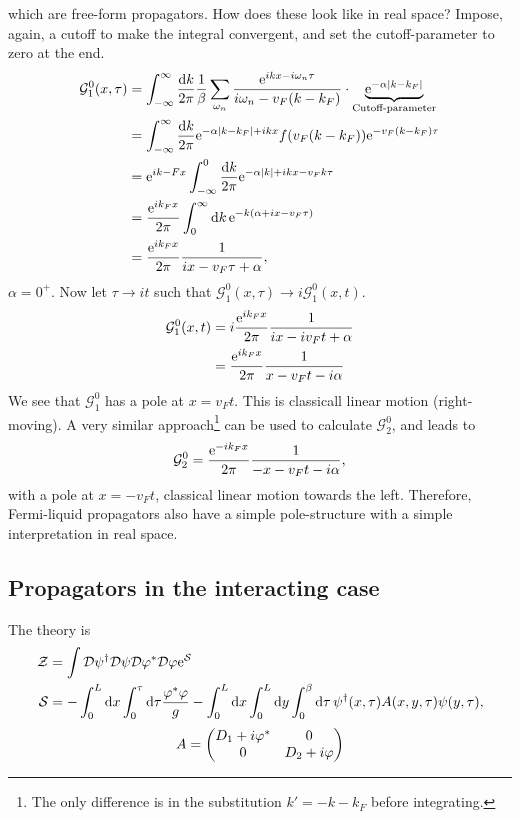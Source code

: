 which are free-form propagators. How does these look like in real space?
Impose, again, a cutoff to make the integral convergent, and set the cutoff-parameter to zero at the end.
\begin{align*}
\mathcal{G}_1^0(x, \tau) &= \int_{-\infty}^\infty\frac{\dd k}{2\pi}\frac{1}{\beta}\sum_{\omega_n}\frac{\mathrm{e}^{ikx - i\omega_n\tau}}{i\omega_n-v_F(k-k_F)}\cdot\underbrace{\mathrm{e}^{-\alpha|k-k_F|}}_{\text{Cutoff-parameter}} \\
&= \int_{-\infty}^\infty\frac{\dd k}{2\pi}\mathrm{e}^{-\alpha|k-k_F| + ikx}f(v_F(k-k_F))\mathrm{e}^{-v_F(k-k_F)\tau}\\
&=\mathrm{e}^{ik-Fx}\int_{-\infty}^0\frac{\dd k}{2\pi}\mathrm{e}^{-\alpha|k| + ikx-v_Fk\tau} \\
&=\frac{\mathrm{e}^{ik_Fx}}{2\pi}\int_0^\infty\dd k\,\mathrm{e}^{-k(\alpha + ix-v_F\tau)} \\
&= \frac{\mathrm{e}^{ik_Fx}}{2\pi}\frac{1}{ix - v_F\tau + \alpha},
\end{align*}
$\alpha = 0^+$. Now let $\tau\rightarrow it$ such that $\mathcal{G}_1^0(x,\tau)\rightarrow i\mathcal{G}_1^0(x, t)$.
\begin{align}
\begin{split}
	\mathcal{G}_1^0(x, t) &=  i\frac{\mathrm{e}^{ik_Fx}}{2\pi}\frac{1}{ix-iv_Ft+\alpha} \\
	&=\frac{\mathrm{e}^{ik_Fx}}{2\pi}\frac{1}{x-v_Ft-i\alpha}
\end{split}
\end{align}
We see that $\mathcal{G}_1^0$ has a pole at $x = v_Ft$. This is classicall linear motion (right-moving). A very similar approach\footnote{The only difference is in the substitution $k' = -k-k_F$ before integrating.} can be used to calculate $\mathcal{G}_2^0$, and leads to 
\begin{equation}
	\mathcal{G}_2^0=\frac{\mathrm{e}^{-ik_Fx}}{2\pi}\frac{1}{-x-v_Ft-i\alpha}, 
\end{equation}
with a pole at $x = -v_Ft$, classical linear motion towards the left.
Therefore, Fermi-liquid propagators also have a simple pole-structure with a simple interpretation in real space. 


\subsection[Interacting propagator]{Propagators in  the interacting case} %

The theory is
\begin{align}
\mathcal{Z} &= \int\mathcal{D}\psi^\dagger\mathcal{D}\psi\mathcal{D}\varphi^*\mathcal{D}\varphi\mathrm{e}^{\mathcal{S}} \\
\mathcal{S} &=-\int_0^L\dd{x}\int_0^\tau\dd\tau \frac{\varphi^*\varphi}{g}-\int_0^L\dd{x}\int_0^L\dd{y}\int_0^\beta\dd\tau\,\psi^\dagger(x,\tau)A(x,y,\tau)\psi(y, \tau),
\end{align}
\begin{equation*}
A = \begin{pmatrix}
D_1 + i\varphi^* & 0\\
0 & D_2+i\varphi
\end{pmatrix}
\end{equation*}

